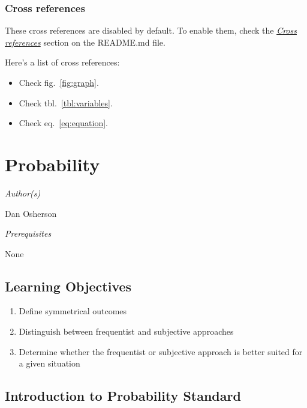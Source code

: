 \documentclass[
  11pt,
,
onecolumn,
openany
]{book}
\providecommand{\tightlist}{%
  \setlength{\itemsep}{0pt}\setlength{\parskip}{0pt}}
\begin{document}
\hypertarget{cross-references}{%
\subsection{Cross references}\label{cross-references}}

These cross references are disabled by default. To enable them, check the
\emph{\href{https://github.com/wikiti/pandoc-book-template\#cross-references}{Cross
references}} section on the README.md file.

Here's a list of cross references:

\begin{itemize}
\tightlist
\item
  Check fig.~\ref{fig:graph}.
\item
  Check tbl.~\ref{tbl:variables}.
\item
  Check eq.~\ref{eq:equation}.
\end{itemize}

\hypertarget{probability}{%
\chapter{Probability}\label{probability}}

\emph{Author(s)}

Dan Osherson

\emph{Prerequisites}

None

\hypertarget{learning-objectives}{%
\section{Learning Objectives}\label{learning-objectives}}

\begin{enumerate}
\def\labelenumi{\arabic{enumi}.}
\item
  Define symmetrical outcomes
\item
  Distinguish between frequentist and subjective approaches
\item
  Determine whether the frequentist or subjective approach is better suited
  for a given situation
\end{enumerate}

\hypertarget{introduction-to-probability-standard}{%
\section{Introduction to Probability
Standard}\label{introduction-to-probability-standard}}
\end{document}
